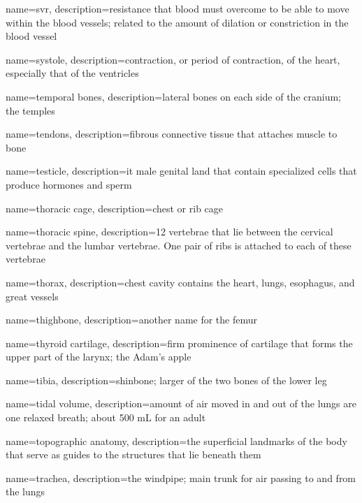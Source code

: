 \documentclass[../../EMT-169.tex]{subfiles}
\begin{document}
	{
		name=\acrlong{svr},
		description={resistance that blood must overcome to be able to move within the blood vessels; related to the amount of dilation or constriction in the blood vessel}
	}

	{
		name=systole,
		description={contraction, or period of contraction, of the heart, especially that of the ventricles}
	}
	
	{
		name=temporal bones,
		description={lateral bones on each side of the cranium; the temples}
	}
	
	{
		name=tendons,
		description={fibrous connective tissue that attaches muscle to bone}
	}
	
	{
		name=testicle,
		description={it male genital land that contain specialized cells that produce hormones and sperm}
	}
	
	{
		name=thoracic cage,
		description={chest or rib cage}
	}
	
	{
		name=thoracic spine,
		description={12 vertebrae that lie between the cervical vertebrae and the lumbar vertebrae. One pair of ribs is attached to each of these vertebrae}
	}
	
	{
		name=thorax,
		description={chest cavity contains the heart, lungs, esophagus, and great vessels}
	}
	
	{
		name=thighbone,
		description={another name for the femur}
	}
	
	{
		name=thyroid cartilage,
		description={firm prominence of cartilage that forms the upper part of the larynx; the Adam's apple}
	}
	
	{
		name=tibia,
		description={shinbone; larger of the two bones of the lower leg}
	}
	
	{
		name=tidal volume,
		description={amount of air moved in and out of the lungs are one relaxed breath; about 500 mL for an adult}
	}
	
	{
		name=topographic anatomy,
		description={the superficial landmarks of the body that serve as guides to the structures that lie beneath them}
	}
	
	{
		name=trachea,
		description={the windpipe; main trunk for air passing to and from the lungs}
	}
	
\end{document}
